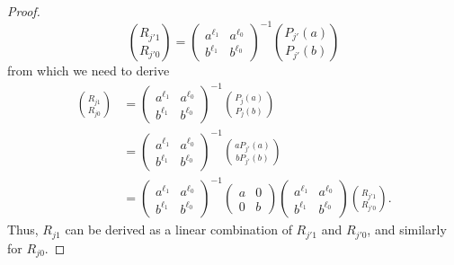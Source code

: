 \begin{proof}
\[\binom{R_{j'1}}{R_{j'0}}=\begin{pmatrix}a^{\ell_1}&a^{\ell_0}\\b^{\ell_1}&b^{\ell_0}\end{pmatrix}^{-1}\binom{P_{j'}(a)}{P_{j'}(b)}\]
from which we need to derive
\begin{align*}
\binom{R_{j1}}{R_{j0}}&=\begin{pmatrix}a^{\ell_1}&a^{\ell_0}\\b^{\ell_1}&b^{\ell_0}\end{pmatrix}^{-1}\binom{P_j(a)}{P_j(b)}\\
&=\begin{pmatrix}a^{\ell_1}&a^{\ell_0}\\b^{\ell_1}&b^{\ell_0}\end{pmatrix}^{-1}\binom{aP_{j'}(a)}{bP_{j'}(b)}\\
&=\begin{pmatrix}a^{\ell_1}&a^{\ell_0}\\b^{\ell_1}&b^{\ell_0}\end{pmatrix}^{-1}\begin{pmatrix}a&0\\0&b\end{pmatrix}\begin{pmatrix}a^{\ell_1}&a^{\ell_0}\\b^{\ell_1}&b^{\ell_0}\end{pmatrix}\binom{R_{j'1}}{R_{j'0}}.
\end{align*}
Thus, $R_{j1}$ can be derived as a linear combination of $R_{j'1}$ and $R_{j'0}$, and similarly for $R_{j0}$.
\end{proof}
